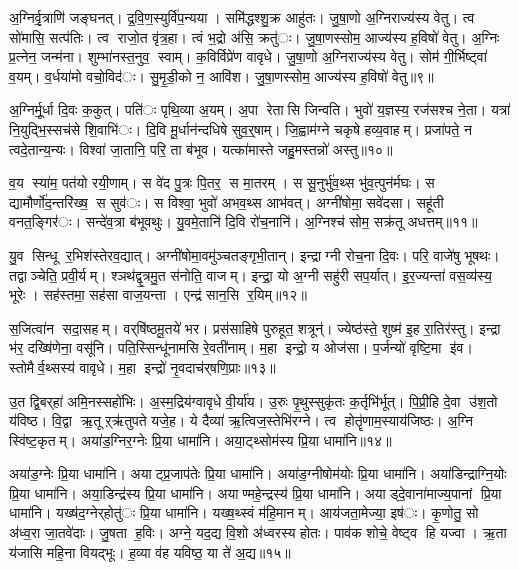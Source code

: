 
अ॒ग्निर्वृ॒त्राणि॑ जङ्घनत्। द्र॒वि॒ण॒स्युर्वि॑प॒न्यया। समि॑द्धश्शु॒क्र आहु॑तः। जु॒षा॒णो अ॒ग्निराज्य॑स्य वेतु। त्व सो॑मासि॒ सत्प॑तिः। त्व राजो॒त वृ॑त्र॒हा। त्वं भ॒द्रो अ॑सि॒ क्रतु॑ः। जु॒षा॒णस्सोम॒ आज्य॑स्य ह॒विषो॑ वेतु। अ॒ग्निः प्र॒त्नेन॒ जन्म॑ना। शुम्भा॑नस्त॒नुव॒ स्वाम्। क॒विर्विप्रे॑ण वावृधे। जु॒षा॒णो अ॒ग्निराज्य॑स्य वेतु। सोम॑ गी॒र्भिष्ट्वा॑ व॒यम्। व॒र्धया॑मो वचो॒विद॑ः। सु॒मृ॒डी॒को न॒ आवि॑श। जु॒षा॒णस्सोम॒ आज्य॑स्य ह॒विषो॑ वेतु॥९॥


अ॒ग्निर्मू॒र्धा दि॒वः क॒कुत्। पति॑ः पृथि॒व्या अ॒यम्। अ॒पा रेतासि जिन्वति। भुवो॑ य॒ज्ञस्य॒ रज॑सश्च ने॒ता। यत्रा॑ नि॒युद्भि॒स्सच॑से शि॒वाभि॑ः। दि॒वि मू॒र्धान॑न्दधिषे सुव॒र्॒षाम्। जि॒ह्वाम॑ग्ने चकृषे हव्य॒वाहम्। प्रजा॑पते॒ न त्वदे॒तान्य॒न्यः। विश्वा॑ जा॒तानि॒ परि॒ ता ब॑भूव। यत्का॑मास्ते जहु॒मस्तन्नो॑ अस्तु॥१०॥

व॒य स्या॑म॒ पत॑यो रयी॒णाम्। स वे॑द पु॒त्रः पि॒तर॒ स मा॒तरम्। स सू॒नुर्भु॑व॒थ्स भु॑व॒त्पुन॑र्मघः। स द्यामौर्णो॑द॒न्तरि॑ख्ष॒ स सुव॑ः। स विश्वा॒ भुवो॑ अभव॒थ्स आभ॑वत्। अग्नी॑षोमा॒ सवे॑दसा। सहू॑ती वनत॒ङ्गिर॑ः। सन्दे॑व॒त्रा ब॑भूवथुः। यु॒वमे॒तानि॑ दि॒वि रो॑च॒नानि॑। अ॒ग्निश्च॑ सोम॒ सक्र॑तू अधत्तम्॥११॥

यु॒व सिन्धू र॒भिश॑स्तेरव॒द्यात्। अग्नी॑षोमा॒वमु॑ञ्चतङ्गृभी॒तान्। इन्द्राग्नी रोच॒ना दि॒वः। परि॒ वाजे॑षु भूषथः। तद्वाञ्चेति॒ प्रवी॒र्यम्। श्ञथ॑द्वृ॒त्रमु॒त स॑नोति॒ वाजम्। इन्द्रा॒ यो अ॒ग्नी सहु॑री सप॒र्यात्। इ॒र॒ज्यन्ता॑ वस॒व्य॑स्य॒ भूरेः। सह॑स्तमा॒ सह॑सा वाज॒यन्ता। एन्द्र॑ सान॒सि र॒यिम्॥१२॥

स॒जित्वा॑न सदा॒सहम्। वर्‌षि॑ष्ठमू॒तये॑ भर। प्रस॑साहिषे पुरुहूत॒ शत्रून्॑। ज्येष्ठ॑स्ते॒ शुष्म॑ इ॒ह रा॒तिर॑स्तु। इन्द्रा भ॑र॒ दख्षि॑णेना॒ वसू॑नि। पति॒स्सिन्धू॑नामसि रे॒वती॑नाम्। म॒हा इन्द्रो॒ य ओज॑सा। प॒र्जन्यो॑ वृष्टि॒मा इ॑व। स्तोमैर्व॒थ्सस्य॑ वावृधे। म॒हा इन्द्रो॑ नृ॒वदाच॑र्‌षणि॒प्राः॥१३॥

उ॒त द्वि॒बर्‌हा॑ अमि॒नस्सहो॑भिः। अ॒स्म॒द्रिय॑ग्वावृधे वी॒र्या॑य। उ॒रुः पृ॒थुस्सुकृ॑तः क॒र्तृभि॑र्भूत्। पि॒प्री॒हि दे॒वा उ॑श॒तो य॑विष्ठ। वि॒द्वा ऋ॒तूऱ्ऋ॑तुपते यजे॒ह। ये दैव्या॑ ऋ॒त्विज॒स्तेभि॑रग्ने। त्व होतॄ॑णाम॒स्याय॑जिष्ठः। अ॒ग्नि स्वि॑ष्ट॒कृतम्। अया॑ड॒ग्निर॒ग्नेः प्रि॒या धामा॑नि। अया॒ट्थ्सोम॑स्य प्रि॒या धामा॑नि॥१४॥

अया॑ड॒ग्नेः प्रि॒या धामा॑नि। अयाट्प्र॒जाप॑तेः प्रि॒या धामा॑नि। अया॑ड॒ग्नीषोम॑योः प्रि॒या धामा॑नि। अया॑डिन्द्राग्नि॒योः प्रि॒या धामा॑नि। अया॒डिन्द्र॑स्य प्रि॒या धामा॑नि। अयाण्महे॒न्द्रस्य॑ प्रि॒या धामा॑नि। अयाड्दे॒वाना॑माज्य॒पानां प्रि॒या धामा॑नि। यख्ष॑द॒ग्नेर्‌होतु॑ः प्रि॒या धामा॑नि। यख्ष॒थ्स्वं म॑हि॒मानम्। आय॑जता॒मेज्या॒ इष॑ः। कृ॒णोतु॒ सो अ॑ध्व॒रा जा॒तवे॑दाः। जु॒षता ह॒विः। अग्ने॒ यद॒द्य वि॒शो अ॑ध्वरस्य होतः। पाव॑क शोचे॒ वेष्ट्व हि यज्वा। ऋ॒ता य॑जासि महि॒ना वियद्भूः। ह॒व्या व॑ह यविष्ठ॒ या ते॑ अ॒द्य॥१५॥

